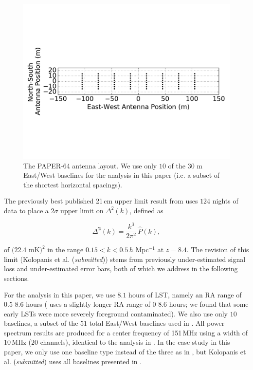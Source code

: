 \documentclass[preprint2,numberedappendix,tighten]{aastex6}  %
\begin{document}
\begin{figure}
	\centering
	\includegraphics[trim={0cm 3cm 0cm 3cm},width=\columnwidth]{plots/ant_layout_aspect.pdf}
	\caption{The PAPER-64 antenna layout. We use only $10$ of the $30$ m East/West baselines for the analysis in this 
paper (i.e. a subset of the shortest horizontal spacings).}
	\label{fig:ant_layout}
\end{figure}

The previously best published 21\,cm upper limit result from  uses $124$ nights of data to place a $2\sigma$ upper limit 
on $\Delta^{2}(k)$, defined as

\begin{equation}
\Delta^{\textbf{2}}(k) = \frac{k^{3}}{2\pi^{2}}\,\hat{P}(k),
\end{equation}

\noindent of $(22.4$ mK$)^{2}$ in the range $0.15 < k < 0.5$\,$h$ Mpc$^{-1}$ at $z = 8.4$. The revision of this limit (Kolopanis et al. (\textit{submitted})) stems from previously under-estimated signal loss and under-estimated error bars, both of which we 
address in the following sections. 

For the analysis in this paper, we use $8.1$ hours of LST, namely an RA range of $0.5$-$8.6$ hours ( uses a slightly longer RA 
range of $0$-$8.6$ hours; we found that some early LSTs were more severely foreground contaminated). We also use only $10$ baselines, a subset of the $51$ total East/West baselines used in . All power spectrum results are produced for a center frequency of 151\,MHz using a width of 10\,MHz ($20$ channels), identical to the analysis in . In the case study in this paper, we only use one baseline type instead of the three as in 
, but Kolopanis et al. (\textit{submitted}) uses all baselines presented in .
\end{document}
